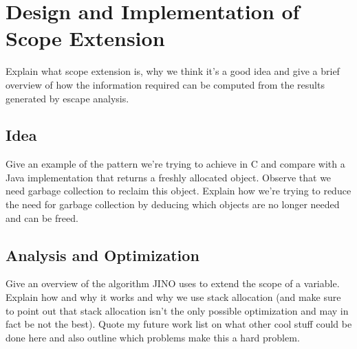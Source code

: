 
\chapter{Design and Implementation of Scope Extension}
	\label{chapter:scopeext}
	Explain what scope extension is, why we think it's a good idea and give a brief overview of how the information
	required can be computed from the results generated by escape analysis.

	\section{Idea}
		\label{sec:scopeext:idea}
		Give an example of the pattern we're trying to achieve in C and compare with a Java implementation that returns
		a freshly allocated object. Observe that we need garbage collection to reclaim this object. Explain how we're trying
		to reduce the need for garbage collection by deducing which objects are no longer needed and can be freed.

	\section{Analysis and Optimization}
		\label{sec:scopeext:analysis}
		Give an overview of the algorithm JINO uses to extend the scope of a variable. Explain how and why it works and why
		we use stack allocation (and make sure to point out that stack allocation isn't the only possible optimization and
		may in fact be not the best). Quote my future work list on what other cool stuff could be done here and also outline
		which problems make this a hard problem.
